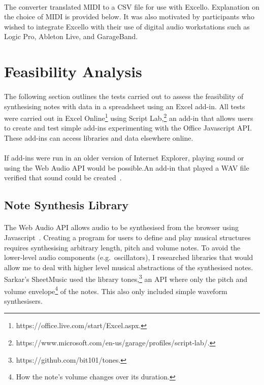 \paragraph{} The converter translated MIDI to a CSV file for use with Excello. Explanation on the choice of MIDI is provided below. It was also motivated by participants who wished to integrate Excello with their use of digital audio workstations such as Logic Pro, Ableton Live, and GarageBand.

\section{Feasibility Analysis}

\paragraph{} The following section outlines the tests carried out to assess the feasibility of synthesising notes with data in a spreadsheet using an Excel add-in. All tests were carried out in Excel Online\footnote{https://office.live.com/start/Excel.aspx.} using Script Lab,\footnote{https://www.microsoft.com/en-us/garage/profiles/script-lab/.} an add-in that allows users to create and test simple add-ins experimenting with the Office Javascript API. These add-ins can access libraries and data elsewhere online.

\paragraph{} If add-ins were run in an older version of Internet Explorer, playing sound or using the Web Audio API would be possible.An add-in that played a WAV file verified that sound could be created~\cite{mozilla:webaudioapi}.

\subsection{Note Synthesis Library}

\paragraph{} The Web Audio API allows audio to be synthesised from the browser using Javascript~\cite{mozilla:webaudioapi}. Creating a program for users to define and play musical structures requires synthesising arbitrary length, pitch and volume notes. To avoid the lower-level audio components (e.g.~oscillators), I researched libraries that would allow me to deal with higher level musical abstractions of the synthesised notes. Sarkar's SheetMusic used the library tones,\footnote{https://github.com/bit101/tones.} an API where only the pitch and volume envelope\footnote{How the note's volume changes over its duration.} of the notes. This also only included simple waveform synthesisers.

